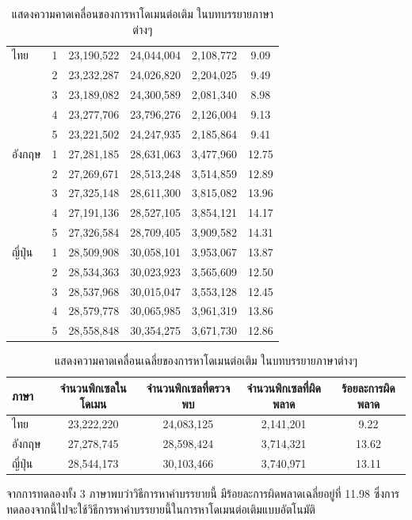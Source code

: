 \documentclass[hidelinks, a4paper,12pt]{article}
\numberwithin{equation}{section}							%
\numberwithin{equation}{section}
\begin{document}
{\begin{table}[H]
\begin{tabular}[ht]{|l|c|c|c|c|c|}
			\hline
			ไทย & 1 & 23,190,522  & 24,044,004 & 2,108,772 &9.09\\
				 & 2 & 23,232,287 & 24,026,820 & 2,204,025 & 9.49\\
				& 3 & 23,189,082 & 24,300,589 & 2,081,340 & 8.98\\
				& 4 & 23,277,706 & 23,796,276  & 2,126,004 & 9.13\\
				& 5 & 23,221,502 & 24,247,935 & 2,185,864 & 9.41\\
			\hline
			อังกฤษ & 1 & 27,281,185 & 28,631,063 & 3,477,960  & 12.75\\
			& 2 & 27,269,671 & 28,513,248 & 3,514,859 & 12.89\\
			& 3 & 27,325,148 & 28,611,300 & 3,815,082 & 13.96\\
			& 4 & 27,191,136 & 28,527,105 & 3,854,121 & 14.17\\
			& 5 & 27,326,584 & 28,709,405 & 3,909,582 & 14.31\\
			\hline
			ญี่ปุ่น & 1 & 28,509,908 & 30,058,101 &  3,953,067 & 13.87\\
			& 2 & 28,534,363  & 30,023,923 & 3,565,609 & 12.50\\
			& 3 & 28,537,968 & 30,015,047 & 3,553,128 & 12.45\\
			& 4 & 28,579,778 & 30,065,985 & 3,961,319 & 13.86\\
			& 5 & 28,558,848 & 30,354,275 & 3,671,730 & 12.86\\
			\hline
		\end{tabular}
		\caption{แสดงความคาดเคลื่อนของการหาโดเมนต่อเติม ในบทบรรยายภาษาต่างๆ}
	\end{table}
	\begin{table}[H]
		\centering
		\begin{tabular}[ht]{|l|c|c|c|c|}
			\hline
			ภาษา  & จำนวนพิกเซลในโดเมน & จำนวนพิกเซลที่ตรวจพบ & จำนวนพิกเซลที่ผิดพลาด & ร้อยละการผิดพลาด \\
			\hline
			ไทย & 23,222,220 & 24,083,125 & 2,141,201 & 9.22 \\
			อังกฤษ & 27,278,745 & 28,598,424 & 3,714,321 & 13.62 \\
			ญี่ปุ่น & 28,544,173 & 30,103,466 & 3,740,971 & 13.11 \\
			\hline
		\end{tabular}
		\caption{แสดงความคาดเคลื่อนเฉลี่ยของการหาโดเมนต่อเติม ในบทบรรยายภาษาต่างๆ}
	\end{table}	
	
	\hspace{1cm} จากการทดลองทั้ง  3 ภาษาพบว่าวิธีการหาคำบรรยายนี้ มีร้อยละการผิดพลาดเฉลี่ยอยู่ที่ 11.98 ซึ่งการทดลองจากนี้ไปจะใช้วิธีการหาคำบรรยายนี้ในการหาโดเมนต่อเติมแบบอัตโนมัติ
	\clearpage
}
\end{document}
